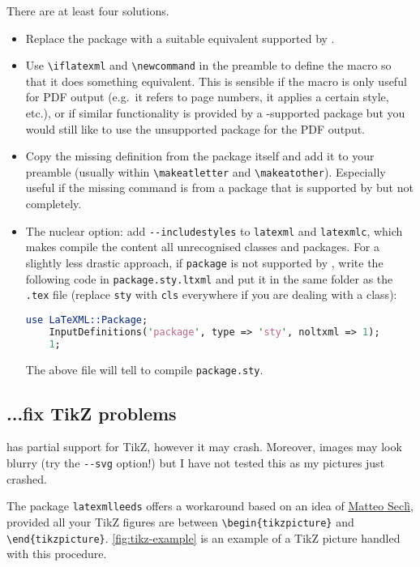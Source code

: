 \documentclass[a4paper]{article}
\def\ltxinline{\lstinline[style=latexml]}
\theoremstyle{definition}
\begin{document}
There are at least four solutions.
\begin{itemize}
  \item Replace the package with a suitable equivalent supported by \LaTeXML{}.
  \item Use \ltxinline|\iflatexml| and \ltxinline|\newcommand| in the preamble to define the macro so that it does something equivalent. This is sensible if the macro is only useful for PDF output (e.g.\ it refers to page numbers, it applies a certain style, etc.), or if similar functionality is provided by a \LaTeXML{}-supported package but you would still like to use the unsupported package for the PDF output.
  \item Copy the missing definition from the package itself and add it to your preamble (usually within \ltxinline|\makeatletter| and \ltxinline|\makeatother|). Especially useful if the missing command is from a package that is supported by \LaTeXML{} but not completely.
  \item The nuclear option: add \verb|--includestyles| to \verb|latexml| and \verb|latexmlc|, which makes \LaTeXML{} compile the content all unrecognised classes and packages. For a slightly less drastic approach, if \verb|package| is not supported by \LaTeXML{}, write the following code in \verb|package.sty.ltxml| and put it in the same folder as the \verb|.tex| file (replace \verb|sty| with \verb|cls| everywhere if you are dealing with a class):
  \begin{lstlisting}[language=Perl]
    use LaTeXML::Package;
    InputDefinitions('package', type => 'sty', noltxml => 1);
    1;
  \end{lstlisting}
  The above file will tell \LaTeXML{} to compile \verb|package.sty|.
\end{itemize}

\subsection{...fix TikZ problems}
\label{sub:tikz-howto}
\LaTeXML{} has partial support for TikZ, however it may crash. Moreover, images may look blurry (try the \verb|--svg| option!) but I have not tested this as my pictures just crashed.

The package \verb|latexmlleeds| offers a workaround based on an idea of \href{https://github.com/brucemiller/LaTeXML/issues/945}{Matteo Seclì}, provided all your TikZ figures are between \ltxinline|\begin{tikzpicture}| and \ltxinline|\end{tikzpicture}|. \autoref{fig:tikz-example} is an example of a TikZ picture handled with this procedure.
\end{document}

